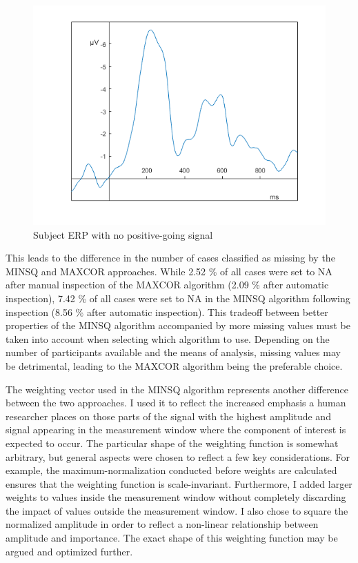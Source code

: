 \documentclass[
  man]{apa7}
\begin{document}
\begin{figure}
\includegraphics[width=0.75\linewidth]{images/only_negative_signal_example} \caption{Subject ERP with no positive-going signal}\label{fig:only-negative-example}
\end{figure}

This leads to the difference in the number of cases classified as missing by the MINSQ and MAXCOR approaches. While 2.52 \% of all cases were set to NA after manual inspection of the MAXCOR algorithm (2.09 \% after automatic inspection), 7.42 \% of all cases were set to NA in the MINSQ algorithm following inspection (8.56 \% after automatic inspection). This tradeoff between better properties of the MINSQ algorithm accompanied by more missing values must be taken into account when selecting which algorithm to use. Depending on the number of participants available and the means of analysis, missing values may be detrimental, leading to the MAXCOR algorithm being the preferable choice.

The weighting vector used in the MINSQ algorithm represents another difference between the two approaches. I used it to reflect the increased emphasis a human researcher places on those parts of the signal with the highest amplitude and signal appearing in the measurement window where the component of interest is expected to occur. The particular shape of the weighting function is somewhat arbitrary, but general aspects were chosen to reflect a few key considerations. For example, the maximum-normalization conducted before weights are calculated ensures that the weighting function is scale-invariant. Furthermore, I added larger weights to values inside the measurement window without completely discarding the impact of values outside the measurement window. I also chose to square the normalized amplitude in order to reflect a non-linear relationship between amplitude and importance. The exact shape of this weighting function may be argued and optimized further.
\end{document}
